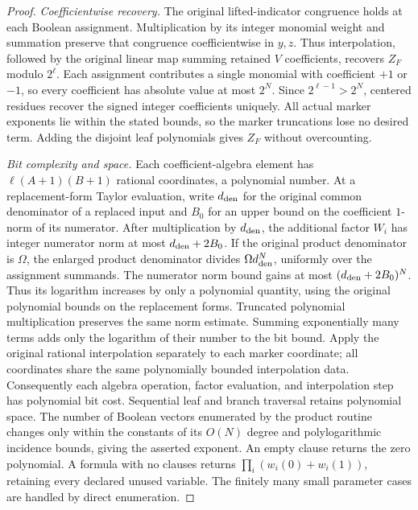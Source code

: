 \documentclass[11pt]{article}
\theoremstyle{remark}\newtheorem{remark}[theorem]{Remark}
\begin{document}
\begin{proof}
\emph{Coefficientwise recovery.}
The original lifted-indicator congruence holds at each Boolean assignment.
Multiplication by its integer monomial weight and summation preserve
that congruence coefficientwise in $y,z$. Thus interpolation, followed by
the original linear map summing retained $V$ coefficients, recovers
$Z_F$ modulo $2^\ell$. Each assignment contributes a single monomial
with coefficient $+1$ or $-1$, so every coefficient has absolute value
at most $2^N$. Since $2^{\ell-1}>2^N$, centered residues recover the
signed integer coefficients uniquely. All actual marker exponents lie
within the stated bounds, so the marker truncations lose no desired
term. Adding the disjoint leaf polynomials gives $Z_F$ without overcounting.

\emph{Bit complexity and space.}
Each coefficient-algebra element has
$\ell(A+1)(B+1)$ rational coordinates, a polynomial number.
At a replacement-form Taylor evaluation, write $d_{\rm den}$ for the
original common denominator of a replaced input and $B_0$ for an upper
bound on the coefficient $1$-norm of its numerator. After multiplication
by $d_{\rm den}$, the additional factor $W_i$ has integer numerator
norm at most $d_{\rm den}+2B_0$. If the original product denominator is
$\Omega$, the enlarged product denominator divides
$\Omega d_{\rm den}^{N}$, uniformly over the assignment summands.
The numerator norm bound gains at most
$(d_{\rm den}+2B_0)^N$. Thus its logarithm increases by only a polynomial
quantity, using the original polynomial bounds on the replacement
forms. Truncated polynomial multiplication preserves the same norm
estimate. Summing exponentially many terms adds only the logarithm of
their number to the bit bound. Apply the original rational interpolation
separately to each marker coordinate; all coordinates share the same
polynomially bounded interpolation data. Consequently each algebra
operation, factor evaluation, and interpolation step has polynomial bit
cost. Sequential leaf and branch traversal retains polynomial space.
The number of Boolean vectors enumerated by the product routine changes
only within the constants of its $O(N)$ degree and polylogarithmic
incidence bounds, giving the asserted exponent.
An empty clause returns the zero polynomial. A formula with no clauses
returns $\prod_i(w_i(0)+w_i(1))$, retaining every declared unused variable.
The finitely many small parameter cases are handled by direct enumeration.
\end{proof}
\end{document}
